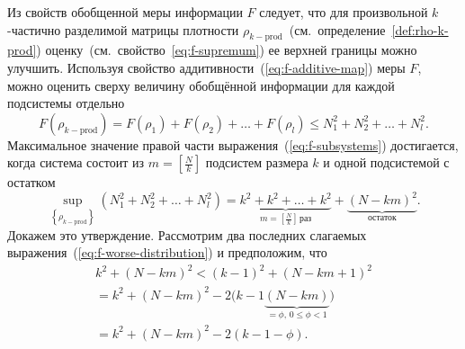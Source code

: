 \begin{definition}\label{def:rho-k-prod}
  
\end{definition}
%
%
Из свойств обобщенной меры информации $F$ следует,
что для произвольной $k$-частично разделимой матрицы плотности $\rho_{k-\mathrm{prod}}$~(см.~определение~\ref{def:rho-k-prod})
оценку~(см.~свойство~\ref{eq:f-supremum}) ее верхней границы можно улучшить.
Используя свойство аддитивности~(\ref{eq:f-additive-map}) меры $F$,
можно оценить сверху величину обобщённой информации для каждой подсистемы отдельно
%
\begin{equation}\label{eq:f-subsystems}
  F(\rho_{k-\mathrm{prod}}) =
  F(\rho_1) + F(\rho_2) + \dots + F(\rho_l)
  \leq N^2_1 + N^2_2 + \dots + N^2_l.
\end{equation}
%
Максимальное значение правой части выражения~(\ref{eq:f-subsystems}) достигается,
когда система состоит из $m = \left[\frac N k \right]$ подсистем размера $k$
и одной подсистемой с остатком
%
\begin{equation}\label{eq:f-worse-distribution}
  \sup_{\left\{\rho_{k-\mathrm{prod}}\right\}}
    \left(N^2_1 + N^2_2 + \dots + N^2_l\right)
  = \underbrace{
    k^2 + k^2 + \dots + k^2
    }_{m = \left[\frac N k \right] \, \mbox{раз}}
    + \underbrace{(N-km)^2}_{\mbox{остаток}}.
\end{equation}
%
Докажем это утверждение.
Рассмотрим два последних слагаемых выражения~(\ref{eq:f-worse-distribution}) и предположим, что
%
\begin{multline}\label{eq:n-i-distribution-inequality}
  k^2 + (N-km)^2 < (k - 1)^2 + (N-km + 1)^2 \\
  = k^2 + (N-km)^2
    - 2\big(k - 1 \underbrace{(N-km)}_{ = \phi, \, 0 \leq \phi < 1}\big) \\
  = k^2 + (N-km)^2 - 2(k - 1 - \phi).
\end{multline}
